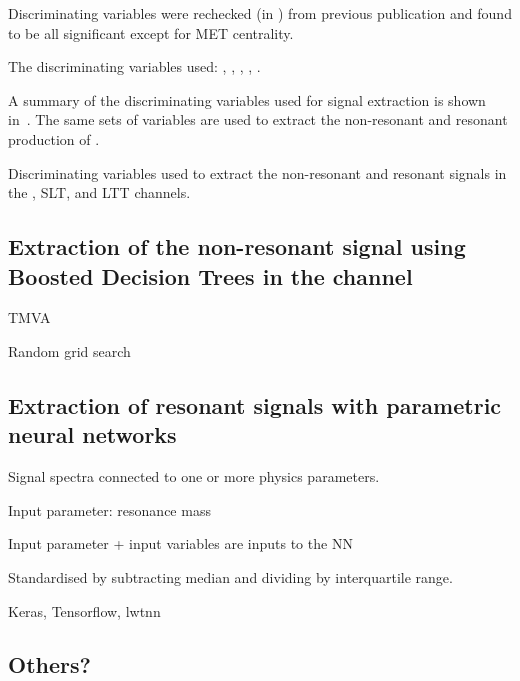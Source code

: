 Discriminating variables were rechecked (in \hadhad) from previous
publication and found to be all significant except for MET centrality.




The discriminating variables used: \mMMC, \mBB, \mHH, \dRtautau, \dRbb.





A summary of the discriminating variables used for signal extraction
is shown in~. The same sets of variables are
used to extract the non-resonant and resonant production of \HH.

\begin{table}[htbp]
  \centering


  \caption{Discriminating variables used to extract the non-resonant
    and resonant \HH signals in the \hadhad, \lephad SLT, and \lephad
    LTT channels.}
  \label{tab:mva_inputvars}
\end{table}



\subsection{Extraction of the non-resonant signal using Boosted
  Decision Trees in the \hadhad channel}
\label{sec:mva_smbdt}

TMVA


Random grid search






\subsection{Extraction of resonant signals with parametric neural networks}
\label{sec:mva_pnn}

Signal spectra connected to one or more physics parameters.

Input parameter: resonance mass \mX

Input parameter + input variables are inputs to the NN

Standardised by subtracting median and dividing by interquartile range.

Keras, Tensorflow, lwtnn






\subsection{Others?}



